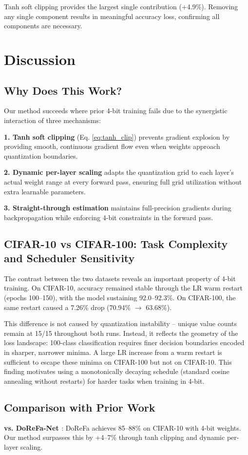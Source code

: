\documentclass[conference]{IEEEtran}
\begin{document}
Tanh soft clipping provides the largest single contribution (+4.9\%). Removing any single component results in meaningful accuracy loss, confirming all components are necessary.

\section{Discussion}

\subsection{Why Does This Work?}
Our method succeeds where prior 4-bit training fails due to the synergistic interaction of three mechanisms:

\textbf{1. Tanh soft clipping} (Eq. \ref{eq:tanh_clip}) prevents gradient explosion by providing smooth, continuous gradient flow even when weights approach quantization boundaries.

\textbf{2. Dynamic per-layer scaling} adapts the quantization grid to each layer's actual weight range at every forward pass, ensuring full grid utilization without extra learnable parameters.

\textbf{3. Straight-through estimation} maintains full-precision gradients during backpropagation while enforcing 4-bit constraints in the forward pass.

\subsection{CIFAR-10 vs CIFAR-100: Task Complexity and Scheduler Sensitivity}
The contrast between the two datasets reveals an important property of 4-bit training. On CIFAR-10, accuracy remained stable through the LR warm restart (epochs 100--150), with the model sustaining 92.0--92.3\%. On CIFAR-100, the same restart caused a 7.26\% drop (70.94\% $\to$ 63.68\%).

This difference is not caused by quantization instability -- unique value counts remain at 15/15 throughout both runs. Instead, it reflects the geometry of the loss landscape: 100-class classification requires finer decision boundaries encoded in sharper, narrower minima. A large LR increase from a warm restart is sufficient to escape these minima on CIFAR-100 but not on CIFAR-10. This finding motivates using a monotonically decaying schedule (standard cosine annealing without restarts) for harder tasks when training in 4-bit.

\subsection{Comparison with Prior Work}
\textbf{vs. DoReFa-Net \cite{zhou2016dorefa}}: DoReFa achieves 85--88\% on CIFAR-10 with 4-bit weights. Our method surpasses this by +4--7\% through tanh clipping and dynamic per-layer scaling.
\end{document}
